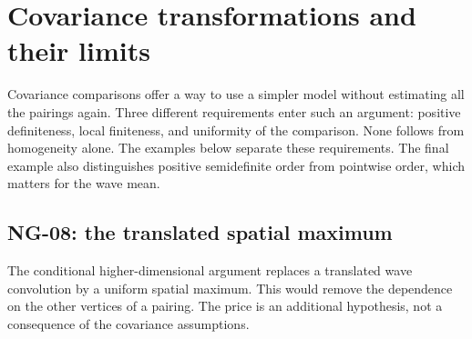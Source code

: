 \section{Covariance transformations and their limits}\label{S:nogo-covariance}

Covariance comparisons offer a way to use a simpler model without estimating
all the pairings again. Three different requirements enter such an argument:
positive definiteness, local finiteness, and uniformity of the comparison.
None follows from homogeneity alone. The examples below separate these
requirements. The final example also distinguishes positive semidefinite
order from pointwise order, which matters for the wave mean.

\subsection{NG-08: the translated spatial maximum}\label{S:nogo-08}

The conditional higher-dimensional argument replaces a translated wave
convolution by a uniform spatial maximum. This would remove the dependence
on the other vertices of a pairing. The price is an additional hypothesis,
not a consequence of the covariance assumptions.

